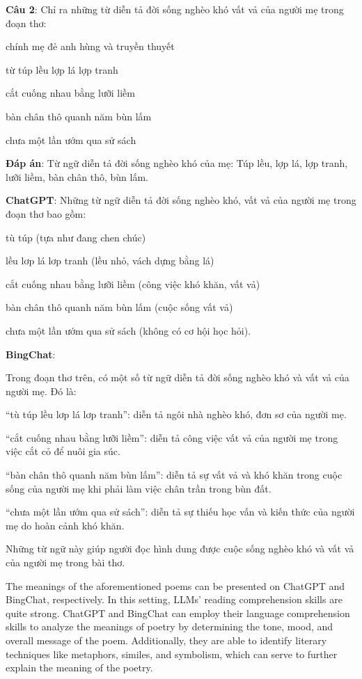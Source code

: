 \documentclass{article}
\begin{document}
{	
	\begin{mdframed}[linewidth=1pt,linecolor=red] 	
\textbf{Câu 2}: Chỉ ra những từ diễn tả đời sống nghèo khó vất vả của người mẹ trong đoạn thơ: 
		
		chính mẹ đẻ anh hùng và truyền thuyết 
		
		từ túp lều lợp lá lợp tranh 
		
		cắt cuống nhau bằng lưỡi liềm 
		
		bàn chân thô quanh năm bùn lấm 
		
		chưa một lần ướm qua sử sách 
		
		
		\textbf{Đáp án}: Từ ngữ diễn tả đời sống nghèo khó của mẹ: Túp lều, lợp lá, lợp tranh, lưỡi liềm, bàn chân thô, bùn lấm. 
		
		\textbf{ChatGPT}: Những từ ngữ diễn tả đời sống nghèo khó, vất vả của người mẹ trong đoạn thơ bao gồm:
		
		
		tù túp (tựa như đang chen chúc)
		
		lều lơp lá lơp tranh (lều nhỏ, vách dựng bằng lá)
		
		cắt cuống nhau bằng lưỡi liềm (công việc khó khăn, vất vả)
		
		bàn chân thô quanh năm bùn lấm (cuộc sống vất vả)
		
		chưa một lần ướm qua sử sách (không có cơ hội học hỏi).
		
		
		\textbf{BingChat}: 
		
		Trong đoạn thơ trên, có một số từ ngữ diễn tả đời sống nghèo khó và vất vả của người mẹ. Đó là:
		
		
		“tù túp lều lơp lá lơp tranh”: diễn tả ngôi nhà nghèo khó, đơn sơ của người mẹ.
		
		“cắt cuống nhau bằng lưỡi liềm”: diễn tả công việc vất vả của người mẹ trong việc cắt cỏ để nuôi gia súc.
		
		“bàn chân thô quanh năm bùn lấm”: diễn tả sự vất vả và khó khăn trong cuộc sống của người mẹ khi phải làm việc chân trần trong bùn đất.
		
		“chưa một lần ướm qua sử sách”: diễn tả sự thiếu học vấn và kiến thức của người mẹ do hoàn cảnh khó khăn.
		
		Những từ ngữ này giúp người đọc hình dung được cuộc sống nghèo khó và vất vả của người mẹ trong bài thơ.
		
	\end{mdframed}	
	
	The meanings of the aforementioned poems can be presented on ChatGPT and BingChat, respectively. In this setting, LLMs' reading comprehension skills are quite strong. ChatGPT and BingChat can employ their language comprehension skills to analyze the meanings of poetry by determining the tone, mood, and overall message of the poem. Additionally, they are able to identify literary techniques like metaphors, similes, and symbolism, which can serve to further explain the meaning of the poetry.
	
}
\end{document}
